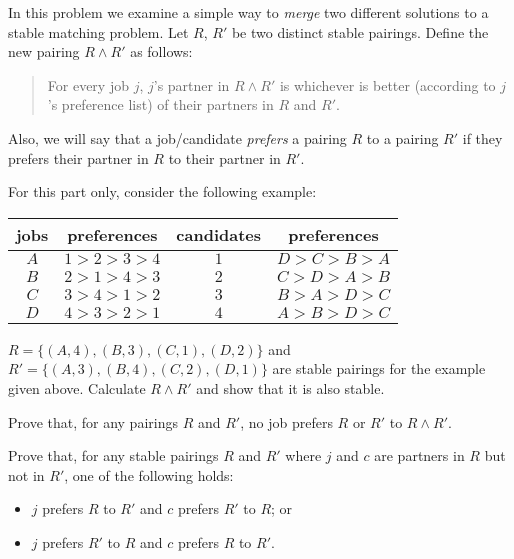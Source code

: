 \documentclass[11pt]{article}
\begin{document}

In this problem we examine a simple way to \emph{merge} two different solutions to a stable matching problem. 
Let $R$, $R'$ be two distinct stable pairings.  Define the new pairing $R \land R'$ as follows: 
\begin{quote}
    For every job $j$, $j$'s partner in $R \land R'$ is whichever is better (according to $j$'s preference list) of their partners in $R$ and $R'$.
\end{quote}
Also, we will say that a job/candidate \textit{prefers} a pairing $R$ to a pairing $R'$ if they prefers their partner in $R$ to their partner in $R'$.

\begin{Parts}
    \Part For this part only, consider the following example:

    \begin{center}
        \begin{tabular}{|c|c||c|c|}\hline
            jobs & preferences & candidates & preferences \\\hline
            $A$ & $1>2>3>4$ & $1$ & $D>C>B>A$ \\\hline
            $B$ & $2>1>4>3$ & $2$ & $C>D>A>B$ \\\hline
            $C$ & $3>4>1>2$ & $3$ & $B>A>D>C$ \\\hline
            $D$ & $4>3>2>1$ & $4$ & $A>B>D>C$ \\\hline
        \end{tabular}
    \end{center}

    $R=\{(A,4),(B,3),(C,1),(D,2)\}$ and $R'=\{(A,3),(B,4),(C,2),(D,1)\}$ are stable pairings for the example given above. Calculate $R \land R'$ and show that it is also stable.

    \Part Prove that, for any pairings $R$ and $R'$, no job prefers $R$ or $R'$ to $R \land R'$.

    \Part Prove that, for any stable pairings $R$ and $R'$ where $j$ and $c$ are partners in $R$ but not in $R'$, one of the following holds:
    \begin{itemize}
        \item $j$ prefers $R$ to $R'$ and $c$ prefers $R'$ to $R$; or
        \item $j$ prefers $R'$ to $R$ and $c$ prefers $R$ to $R'$.
    \end{itemize}


\end{Parts}
\end{document}
